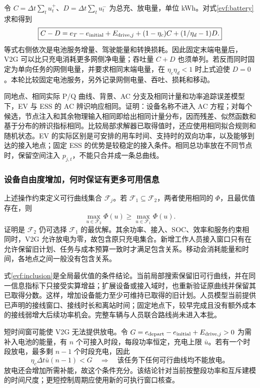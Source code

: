 \documentclass[UTF8,fontset=fandol,11pt,a4paper]{ctexart}
\begin{document}
令 $C=\Delta t\sum_tu_t^+$、$D=\Delta t\sum_tu_t^-$ 为总充、放电量，单位 kWh。对式\eqref{evf:battery}求和得到
\begin{equation}
 \boxed{C-D=e_T-e_{\rm initial}+E_{{\rm drive},j}
 +(1-\eta_c)C+(1/\eta_d-1)D.}
 \label{evf:energy-account}
\end{equation}
等式右侧依次是电池服务增量、驾驶能量和转换损耗。因此固定末端电量后，V2G 可以比只充电消耗更多网侧净电量；吞吐量 $C+D$ 也须单列。若反而同时固定为单向任务的网侧电量，并要求相同末端电量，在 $\eta_c\eta_d<1$ 时上式迫使 $D=0$。本轮比较固定电池服务，另外记录网侧电量、吞吐、损耗和移动。

同地点、相同实际 P/Q 曲线、背景、AC 分支及相同计量和功率追踪误差模型下，EV 与 ESS 的 AC 辨识响应相同。证明：设备名称不进入 AC 方程；对每个候选，节点注入和其余物理输入相同即给出相同计量分布，因而残差、似然函数和基于分布的辨识指标相同。比较局部求解器已取得值时，还应使用相同拟合规则和随机状态。EV 的实际区别是可安排的用车时间、支持时的双向功率，以及能够到达的接入地点；固定 ESS 的优势是较稳定的接入条件。相同总功率放在不同节点时，保留空间注入 $p_{j,t}$，不能只合并成一条总曲线。

\subsubsection{设备自由度增加，何时保证有更多可用信息}

上述操作约束定义可行曲线集合 $\mathcal F_j$。若 $\mathcal F_1\subseteq\mathcal F_2$，两者使用相同的 $\Phi$，且最优值存在，则
\begin{equation}
 \max_{u\in\mathcal F_2}\Phi(u)\ge
 \max_{u\in\mathcal F_1}\Phi(u).
 \label{evf:inclusion}
\end{equation}
证明是 $\mathcal F_2$ 仍可选择 $\mathcal F_1$ 的最优解。其余功率、接入、SOC、效率和服务约束相同时，V2G 允许放电为零，故包含原只充电集合。新增工作人员接入窗口只有在允许保留旧计划、任务与成本预算一致时才满足包含关系。移动会消耗能量和时间，各地点之间一般没有包含关系。

式\eqref{evf:inclusion}是全局最优值的条件结论。当前局部搜索保留旧可行曲线，并在同一信息指标下只接受实算增益；扩展设备或接入域时，也重新验证原曲线并保留其已取得分数。这样，增加设备能力至少可维持已取得的旧计划。人员模型当前提供已声明的接线窗口、接线时长和离站时间；固定地点下，较早完成且没有额外成本的接线弱增大后续功率机会。完整车辆与人员联合路线尚未进入本批。

短时间窗可能使 V2G 无法提供放电。令 $G=e_{\rm depart}-e_{\rm initial}+E_{{\rm drive},j}>0$ 为需补入电池的能量，有 $n$ 个可接入时段，每段功率恒定，充电上限 $\bar u$。若有一个时段放电，最多剩 $n-1$ 个时段充电，因此
\begin{equation}
 \eta_c\Delta t\bar u(n-1)<G
 \quad\Longrightarrow\quad\text{该任务下任何可行曲线均不能放电。}
 \label{evf:short-window}
\end{equation}
放电还会增加所需补能，故这个条件充分。该结论针对当前按整段功率和互斥建模的时间尺度；更短控制周期应使用新的可执行窗口核查。
\end{document}
